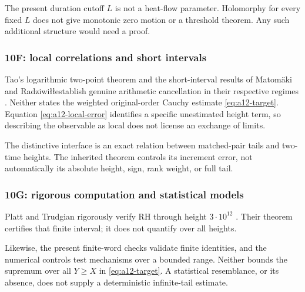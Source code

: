 The present duration cutoff $L$ is not a heat-flow parameter.
Holomorphy for every fixed $L$ does not give monotonic zero motion or a
threshold theorem. Any such additional structure would need a proof.

\subsubsection{10F: local correlations and short intervals}
\label{subsubsec:a12-lit-local}
Tao's logarithmic two-point theorem and the short-interval results of
Matom\"aki and Radziwi\l\l establish genuine arithmetic cancellation in
their respective regimes \cite{Tao2016,MatomakiRadziwill2016}.
Neither states the weighted original-order Cauchy estimate
\eqref{eq:a12-target}. Equation \eqref{eq:a12-local-error} identifies
a specific unestimated height term, so describing the observable as local
does not license an exchange of limits.

The distinctive interface is an exact relation between matched-pair tails
and two-time heights. The inherited theorem controls its increment error,
not automatically its absolute height, sign, rank weight, or full tail.

\subsubsection{10G: rigorous computation and statistical models}
\label{subsubsec:a12-lit-numerics}
Platt and Trudgian rigorously verify RH through height $3\cdot10^{12}$
\cite{PlattTrudgian2021}. Their theorem certifies that finite interval; it
does not quantify over all heights.

Likewise, the present finite-word checks validate finite identities, and
the numerical controls test mechanisms over a bounded range. Neither
bounds the supremum over all $Y\ge X$ in \eqref{eq:a12-target}.
A statistical resemblance, or its absence, does not supply a
deterministic infinite-tail estimate.

